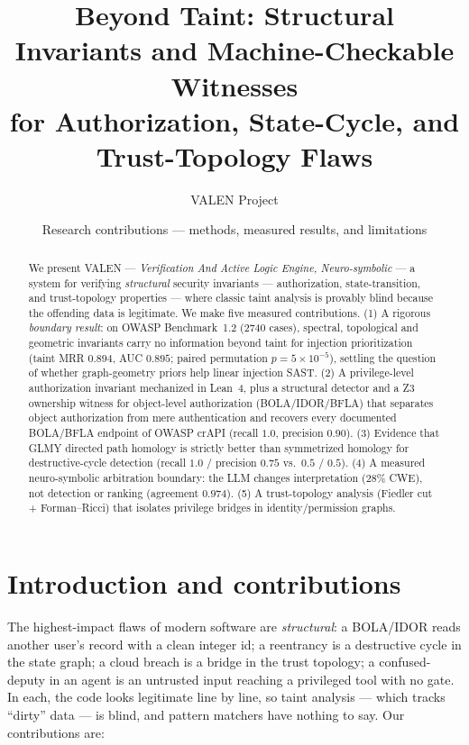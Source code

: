 \documentclass[11pt]{article}
\title{\bfseries Beyond Taint: Structural Invariants and Machine-Checkable
Witnesses\\ for Authorization, State-Cycle, and Trust-Topology Flaws}
\author{VALEN Project}
\date{Research contributions --- methods, measured results, and limitations}
\begin{document}
\maketitle

\begin{abstract}
\noindent We present VALEN --- \emph{Verification And Active Logic Engine,
Neuro-symbolic} --- a system for verifying \emph{structural} security
invariants --- authorization, state-transition, and trust-topology properties ---
where classic taint analysis is provably blind because the offending data is
legitimate. We make five measured contributions. (1) A rigorous \emph{boundary
result}: on OWASP Benchmark~1.2 (2740 cases), spectral, topological and geometric
invariants carry no information beyond taint for injection prioritization (taint
MRR $0.894$, AUC $0.895$; paired permutation $p=5\times10^{-5}$), settling the
question of whether graph-geometry priors help linear injection SAST. (2) A
privilege-level authorization invariant mechanized in Lean~4, plus a structural
detector and a Z3 ownership witness for object-level authorization (BOLA/IDOR/BFLA)
that separates object authorization from mere authentication and recovers every
documented BOLA/BFLA endpoint of OWASP crAPI (recall $1.0$, precision $0.90$).
(3) Evidence that GLMY directed path homology is strictly better than symmetrized
homology for destructive-cycle detection (recall $1.0$ / precision $0.75$ vs.\
$0.5$ / $0.5$). (4) A measured neuro-symbolic arbitration boundary: the LLM
changes interpretation ($28\%$ CWE), not detection or ranking (agreement
$0.974$). (5) A trust-topology analysis (Fiedler cut + Forman--Ricci) that
isolates privilege bridges in identity/permission graphs.
\end{abstract}

\section{Introduction and contributions}
The highest-impact flaws of modern software are \emph{structural}: a BOLA/IDOR
reads another user's record with a clean integer id; a reentrancy is a
destructive cycle in the state graph; a cloud breach is a bridge in the trust
topology; a confused-deputy in an agent is an untrusted input reaching a
privileged tool with no gate. In each, the code looks legitimate line by line, so
taint analysis --- which tracks ``dirty'' data --- is blind, and pattern matchers
have nothing to say. Our contributions are:
\end{document}
